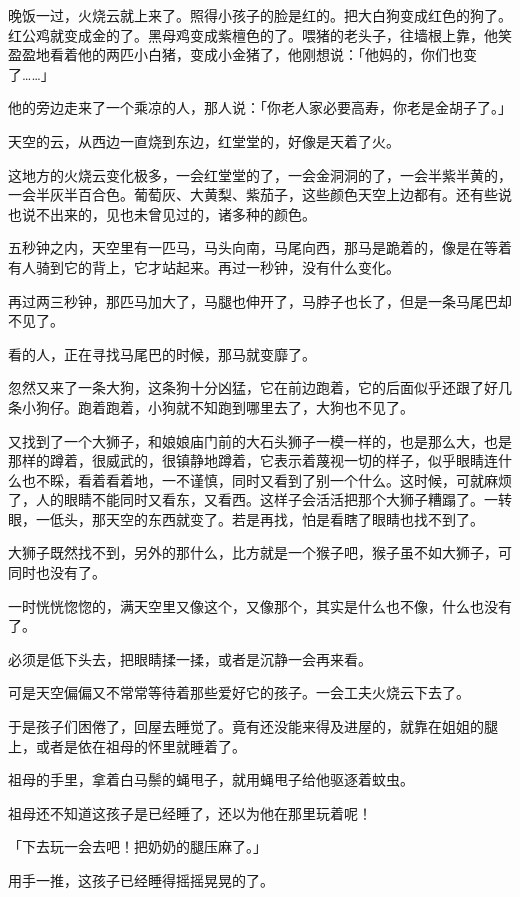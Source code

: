 \documentclass[UTF8]{ctexart}
\begin{document}
晚饭一过，火烧云就上来了。照得小孩子的脸是红的。把大白狗变成红色的狗了。红公鸡就变成金的了。黑母鸡变成紫檀色的了。喂猪的老头子，往墙根上靠，他笑盈盈地看着他的两匹小白猪，变成小金猪了，他刚想说：「他妈的，你们也变了……」

他的旁边走来了一个乘凉的人，那人说：「你老人家必要高寿，你老是金胡子了。」

天空的云，从西边一直烧到东边，红堂堂的，好像是天着了火。

这地方的火烧云变化极多，一会红堂堂的了，一会金洞洞的了，一会半紫半黄的，一会半灰半百合色。葡萄灰、大黄梨、紫茄子，这些颜色天空上边都有。还有些说也说不出来的，见也未曾见过的，诸多种的颜色。

五秒钟之内，天空里有一匹马，马头向南，马尾向西，那马是跪着的，像是在等着有人骑到它的背上，它才站起来。再过一秒钟，没有什么变化。

再过两三秒钟，那匹马加大了，马腿也伸开了，马脖子也长了，但是一条马尾巴却不见了。

看的人，正在寻找马尾巴的时候，那马就变靡了。

忽然又来了一条大狗，这条狗十分凶猛，它在前边跑着，它的后面似乎还跟了好几条小狗仔。跑着跑着，小狗就不知跑到哪里去了，大狗也不见了。

又找到了一个大狮子，和娘娘庙门前的大石头狮子一模一样的，也是那么大，也是那样的蹲着，很威武的，很镇静地蹲着，它表示着蔑视一切的样子，似乎眼睛连什么也不睬，看着看着地，一不谨慎，同时又看到了别一个什么。这时候，可就麻烦了，人的眼睛不能同时又看东，又看西。这样子会活活把那个大狮子糟蹋了。一转眼，一低头，那天空的东西就变了。若是再找，怕是看瞎了眼睛也找不到了。

大狮子既然找不到，另外的那什么，比方就是一个猴子吧，猴子虽不如大狮子，可同时也没有了。

一时恍恍惚惚的，满天空里又像这个，又像那个，其实是什么也不像，什么也没有了。

必须是低下头去，把眼睛揉一揉，或者是沉静一会再来看。

可是天空偏偏又不常常等待着那些爱好它的孩子。一会工夫火烧云下去了。

于是孩子们困倦了，回屋去睡觉了。竟有还没能来得及进屋的，就靠在姐姐的腿上，或者是依在祖母的怀里就睡着了。

祖母的手里，拿着白马鬃的蝇甩子，就用蝇甩子给他驱逐着蚊虫。

祖母还不知道这孩子是已经睡了，还以为他在那里玩着呢！

「下去玩一会去吧！把奶奶的腿压麻了。」

用手一推，这孩子已经睡得摇摇晃晃的了。
\end{document}
